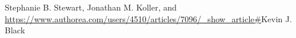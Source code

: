 Stephanie B. Stewart, Jonathan M. Koller, and \url{https://www.authorea.com/users/4510/articles/7096/_show_article#}Kevin J. Black